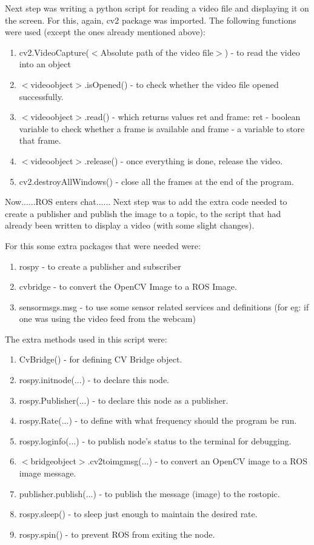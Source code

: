\documentclass{article}
\begin{document}
Next step was writing a python script for reading a video file and displaying it on the screen. For this, again, cv2 package was imported. The following functions were used (except the ones already mentioned above): 
\begin{enumerate}
    \item cv2.VideoCapture($<$Absolute path of the video file$>$) - to read the video into an object
    \item $<$videoobject$>$.isOpened() - to check whether the video file opened successfully.
    \item $<$videoobject$>$.read() - which returns values ret and frame: ret - boolean variable to check whether a frame is available and frame - a variable to store that frame.
    \item $<$videoobject$>$.release() - once everything is done, release the video.
    \item cv2.destroyAllWindows() - close all the frames at the end of the program.
\end{enumerate}

Now......ROS enters chat......
Next step was to add the extra code needed to create a publisher and publish the image to a topic, to the script that had already been written to display a video (with some slight changes).

For this some extra packages that were needed were: 
\begin{enumerate}
    \item rospy - to create a publisher and subscriber
    \item cv\textunderscore bridge - to convert the OpenCV Image to a ROS Image.
    \item sensor\textunderscore msgs.msg - to use some sensor related services and definitions (for eg: if one was using the video feed from the webcam)
\end{enumerate}

The extra methods used in this script were:
\begin{enumerate}
    \item CvBridge() - for defining  CV Bridge object.
    \item rospy.init\textunderscore node(...) - to declare this node.
    \item rospy.Publisher(...) - to declare this node as a publisher.
    \item rospy.Rate(...) - to define with what frequency should the program be run.
    \item rospy.loginfo(...) - to publish node's status to the terminal for debugging.
    \item $<$bridgeobject$>$.cv2\textunderscore to\textunderscore imgmsg(...) - to convert an OpenCV image to a ROS image message.
    \item publisher.publish(...) - to publish the message (image) to the rostopic. 
    \item rospy.sleep() - to sleep just enough to maintain the desired rate.
    \item rospy.spin() - to prevent ROS from exiting the node.
\end{enumerate}
\end{document}
